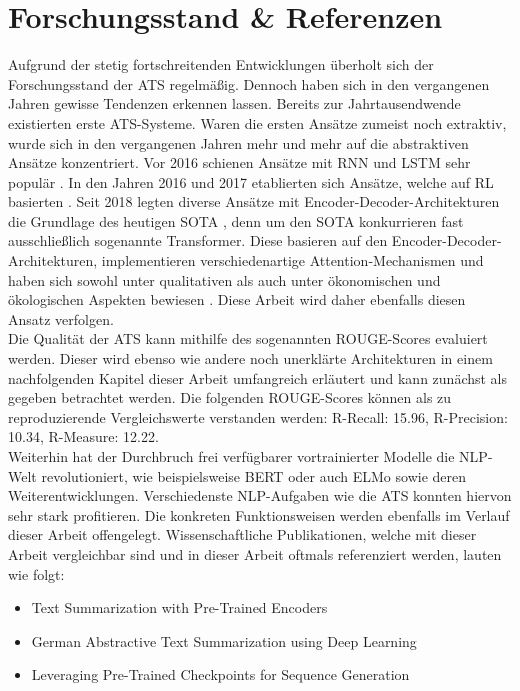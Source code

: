 \section{Forschungsstand \& Referenzen}
\noindent
Aufgrund der stetig fortschreitenden Entwicklungen überholt sich der Forschungsstand der \ac{ATS} regelmäßig. Dennoch haben sich in den vergangenen Jahren gewisse Tendenzen erkennen lassen. Bereits zur Jahrtausendwende existierten erste \ac{ATS}-Systeme. Waren die ersten Ansätze zumeist noch extraktiv, wurde sich in den vergangenen Jahren mehr und mehr auf die abstraktiven Ansätze konzentriert. Vor 2016 schienen Ansätze mit \ac{RNN} und \ac{LSTM} sehr populär \cite{NAL16}. In den Jahren 2016 und 2017 etablierten sich Ansätze, welche auf \ac{RL} basierten \cite{PAU17}. Seit 2018 legten diverse Ansätze mit Encoder-Decoder-Architekturen die Grundlage des heutigen \ac{SOTA} \cite{YAN19, ROT20}, denn um den \ac{SOTA} konkurrieren fast ausschließlich sogenannte Transformer. Diese basieren auf den Encoder-Decoder-Architekturen, implementieren verschiedenartige Attention-Mechanismen und haben sich sowohl unter qualitativen als auch unter ökonomischen und ökologischen Aspekten bewiesen \cite{ZHA20}. Diese Arbeit wird daher ebenfalls diesen Ansatz verfolgen.\\

\noindent
Die Qualität der \ac{ATS} kann mithilfe des sogenannten ROUGE-Scores evaluiert werden. Dieser wird ebenso wie andere noch unerklärte Architekturen in einem nachfolgenden Kapitel dieser Arbeit umfangreich erläutert und kann zunächst als gegeben betrachtet werden. Die folgenden ROUGE-Scores können als zu reproduzierende Vergleichswerte verstanden werden: R-Recall: 15.96, R-Precision: 10.34, R-Measure: 12.22.\\

\noindent
Weiterhin hat der Durchbruch frei verfügbarer vortrainierter Modelle die \ac{NLP}-Welt revolutioniert, wie beispielsweise \ac{BERT} \cite{DEV19} oder auch \ac{ELMo} \cite{PET18} sowie deren Weiterentwicklungen. Verschiedenste \ac{NLP}-Aufgaben wie die \ac{ATS} konnten hiervon sehr stark profitieren. Die konkreten Funktionsweisen werden ebenfalls im Verlauf dieser Arbeit offengelegt. Wissenschaftliche Publikationen, welche mit dieser Arbeit vergleichbar sind und in dieser Arbeit oftmals referenziert werden, lauten wie folgt:

\begin{itemize}
	\item Text Summarization with Pre-Trained Encoders \cite{YAN19}
	\item German Abstractive Text Summarization using Deep Learning \cite{NIT19}
	\item Leveraging Pre-Trained Checkpoints for Sequence Generation \cite{ROT20}
\end{itemize}
